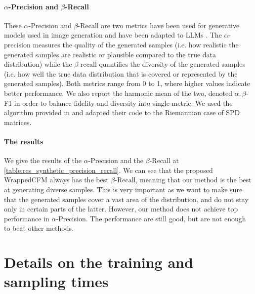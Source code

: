 \documentclass[10pt]{article} %
\theoremstyle{plain}
\theoremstyle{definition}
\theoremstyle{remark}
\begin{document}
\paragraph{$\alpha$-Precision and $\beta$-Recall}
These $\alpha$-Precision and $\beta$-Recall are two metrics have been used for generative models used in image generation \citep{sajjadi2018assessing, kynkaanniemi2019improved} and have been adapted to LLMs \citep{bronnec2024exploring}. The $\alpha$-precision measures the quality of the generated samples (i.e. how realistic the generated samples are realistic or plausible compared to the true data distribution) while the $\beta$-recall quantifies the diversity of the generated samples (i.e. how well the true data distribution that is covered or represented by the generated samples). Both metrics range from 0 to 1, where higher values indicate better performance. We also report the harmonic mean of the two, denoted $\alpha, \beta$-F1 in order to balance fidelity and diversity into single metric. We used the algorithm provided in \citet{bronnec2024exploring} and adapted their code to the Riemannian case of SPD matrices.

\paragraph{The results}
We give the results of the $\alpha$-Precision and the $\beta$-Recall at \cref{table:res_synthetic_precision_recall}. We can see that the proposed WrappedCFM always has the best $\beta$-Recall, meaning that our method is the best at generating diverse samples. This is very important as we want to make sure that the generated samples cover a vast area of the distribution, and do not stay only in certain parts of the latter. However, our method does not achieve top performance in $\alpha$-Precision. The performance are still good, but are not enough to beat other methods.


\section{Details on the training and sampling times}
\label{appendix:training_times}
\end{document}
